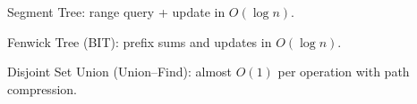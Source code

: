 Segment Tree: range query + update in $O(\log n)$.

Fenwick Tree (BIT): prefix sums and updates in $O(\log n)$.

Disjoint Set Union (Union–Find): almost $O(1)$ per operation with path compression.